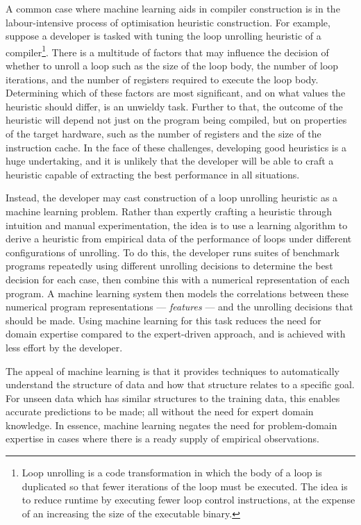A common case where machine learning aids in compiler construction is in the labour-intensive process of optimisation heuristic construction. For example, suppose a developer is tasked with tuning the loop unrolling heuristic of a compiler\footnote{Loop unrolling is a code transformation in which the body of a loop is duplicated so that fewer iterations of the loop must be executed. The idea is to reduce runtime by executing fewer loop control instructions, at the expense of an increasing the size of the executable binary.}. There is a multitude of factors that may influence the decision of whether to unroll a loop such as the size of the loop body, the number of loop iterations, and the number of registers required to execute the loop body. Determining which of these factors are most significant, and on what values the heuristic should differ, is an unwieldy task. Further to that, the outcome of the heuristic will depend not just on the program being compiled, but on properties of the target hardware, such as the number of registers and the size of the instruction cache. In the face of these challenges, developing good heuristics is a huge undertaking, and it is unlikely that the developer will be able to craft a heuristic capable of extracting the best performance in all situations.

Instead, the developer may cast construction of a loop unrolling heuristic as a machine learning problem. Rather than expertly crafting a heuristic through intuition and manual experimentation, the idea is to use a learning algorithm to derive a heuristic from empirical data of the performance of loops under different configurations of unrolling. To do this, the developer runs suites of benchmark programs repeatedly using different unrolling decisions to determine the best decision for each case, then combine this with a numerical representation of each program. A machine learning system then models the correlations between these numerical program representations --- \emph{features} --- and the unrolling decisions that should be made. Using machine learning for this task reduces the need for domain expertise compared to the expert-driven approach, and is achieved with less effort by the developer.

The appeal of machine learning is that it provides techniques to automatically understand the structure of data and how that structure relates to a specific goal. For unseen data which has similar structures to the training data, this enables accurate predictions to be made; all without the need for expert domain knowledge. In essence, machine learning negates the need for problem-domain expertise in cases where there is a ready supply of empirical observations.

